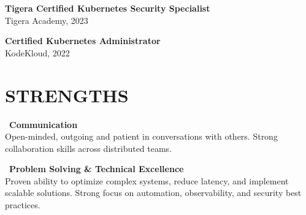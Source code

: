 \documentclass[11pt,a4paper]{article}
\begin{document}
\textbf{Tigera Certified Kubernetes Security Specialist}\\
Tigera Academy, 2023

\textbf{Certified Kubernetes Administrator}\\
KodeKloud, 2022

\section*{STRENGTHS}

\faComments\ \textbf{Communication}\\
Open-minded, outgoing and patient in conversations with others. Strong collaboration skills across distributed teams.

\vspace{6pt}

\faStar\ \textbf{Problem Solving \& Technical Excellence}\\
Proven ability to optimize complex systems, reduce latency, and implement scalable solutions. Strong focus on automation, observability, and security best practices.
\end{document}
